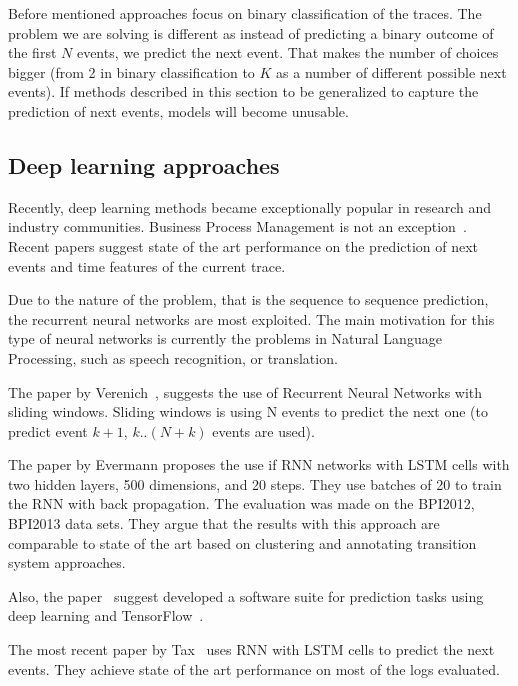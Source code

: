 Before mentioned approaches focus on binary classification of the traces. The problem we are solving is different as instead of predicting a binary outcome of the first $N$ events, we predict the next event. That makes the number of choices bigger (from 2 in binary classification to $K$ as a number of different possible next events). If methods described in this section to be generalized to capture the prediction of next events, models will become unusable.

\subsection{Deep learning approaches} \label{deeplearning-stateoftheart}

Recently, deep learning methods became exceptionally popular in research and industry communities. Business Process Management is not an exception~\cite{quteprints96732,niek96732,evermann}. Recent papers suggest state of the art performance on the prediction of next events and time features of the current trace.

Due to the nature of the problem, that is the sequence to sequence prediction, the recurrent neural networks are most exploited. The main motivation for this type of neural networks is currently the problems in Natural Language Processing, such as speech recognition\cite{graves2013icassp}, or translation\cite{Sutskever2014SSL29690332969173}. 

The paper by Verenich~\cite{quteprints96732}, suggests the use of Recurrent Neural Networks with sliding windows. Sliding windows is using N events to predict the next one (to predict event $k+1$,  $k..(N+k)$ events are used). 

The paper by Evermann\cite{evermann} proposes the use if RNN networks with LSTM cells with two hidden layers, 500 dimensions, and 20 steps. They use batches of 20 to train the RNN with back propagation. The evaluation was made on the BPI2012, BPI2013 data sets. They argue that the results with this approach are comparable to state of the art based on clustering and annotating transition system approaches.

Also, the paper~\cite{evermann2} suggest developed a software suite for prediction tasks using deep learning and TensorFlow~\cite{tensorflow2015-whitepaper}.

The most recent paper by Tax~\cite{niek96732} uses RNN with LSTM cells to predict the next events. They achieve state of the art performance on most of the logs evaluated. 

